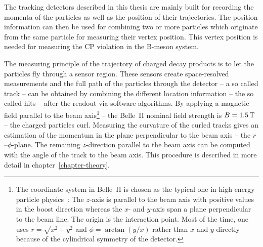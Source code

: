 The tracking detectors described in this thesis are mainly built for recording the momenta of the particles as well as the position of their trajectories. The position information can then be used for combining two or more particles which originate from the same particle for measuring their vertex position. This vertex position is needed for measuring the CP violation in the B-meson system. %

The measuring principle of the trajectory of charged decay products is to let the particles fly through a sensor region. These sensors create space-resolved measurements and the full path of the particles through the detector -- a so called track -- can be obtained by combining the different location information -- the so called hits -- after the readout via software algorithms. By applying a magnetic field parallel to the beam axis\footnote{The coordinate system in Belle~II is chosen as the typical one in high energy particle physics~\cite{coordinate}: The $z$-axis is parallel to the beam axis with positive values in the boost direction whereas the $x$- and $y$-axis span a plane perpendicular to the beam line. The origin is the interaction point. Most of the time, one uses $r = \sqrt{x^2 + y^2}$ and $\phi = \arctan(y/x)$ rather than $x$ and $y$ directly because of the cylindrical symmetry of the detector.} -- the Belle~II nominal field strength is $B = \unit[1.5]{T}$ -- the charged particles curl. Measuring the curvature of the curled tracks gives an estimation of the momentum in the plane perpendicular to the beam axis -- the $r$--$\phi$-plane. The remaining $z$-direction parallel to the beam axis can be computed with the angle of the track to the beam axis. This procedure is described in more detail in chapter~\ref{chapter-theory}.

